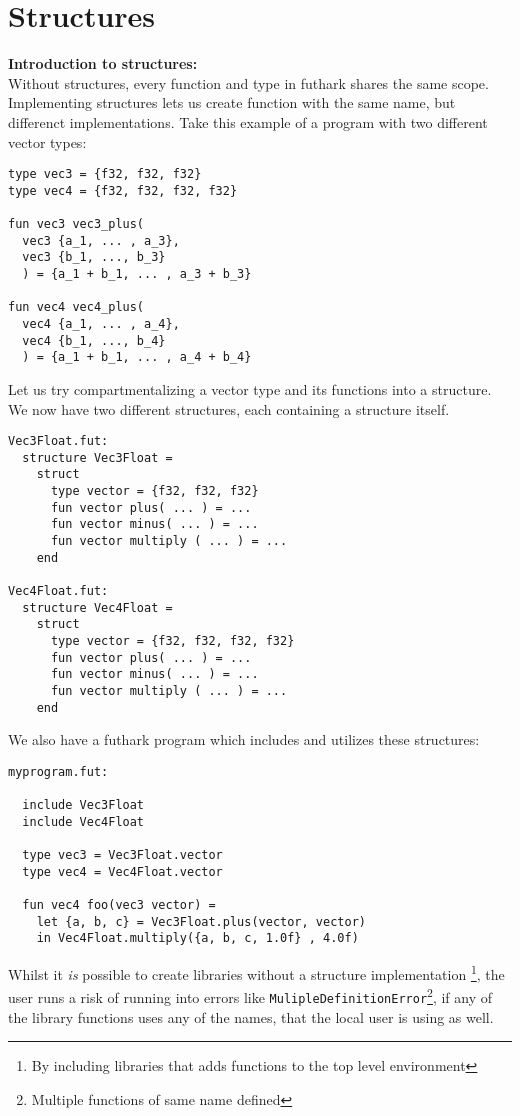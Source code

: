 \section{Structures}
\label{sec:structures}
\textbf{Introduction to structures:}\\
\label{subsec:structuresintroduction}
Without structures, every function and type in futhark shares the same scope.
Implementing structures lets us create function with the same name, but differenct implementations.
Take this example of a program with two different vector types:
\begin{verbatim}
type vec3 = {f32, f32, f32}
type vec4 = {f32, f32, f32, f32}

fun vec3 vec3_plus(
  vec3 {a_1, ... , a_3}, 
  vec3 {b_1, ..., b_3}
  ) = {a_1 + b_1, ... , a_3 + b_3}

fun vec4 vec4_plus(
  vec4 {a_1, ... , a_4}, 
  vec4 {b_1, ..., b_4}
  ) = {a_1 + b_1, ... , a_4 + b_4}
\end{verbatim}

Let us try compartmentalizing a vector type and its functions into a structure.
We now have two different structures, each containing a structure itself.
\begin{verbatim}
Vec3Float.fut:
  structure Vec3Float = 
    struct
      type vector = {f32, f32, f32}
      fun vector plus( ... ) = ...
      fun vector minus( ... ) = ...
      fun vector multiply ( ... ) = ...
    end

Vec4Float.fut:
  structure Vec4Float = 
    struct
      type vector = {f32, f32, f32, f32}
      fun vector plus( ... ) = ...
      fun vector minus( ... ) = ...
      fun vector multiply ( ... ) = ...
    end
\end{verbatim}
\clearpage
We also have a futhark program which includes and utilizes these structures:
\begin{verbatim}
myprogram.fut:

  include Vec3Float
  include Vec4Float

  type vec3 = Vec3Float.vector
  type vec4 = Vec4Float.vector
  
  fun vec4 foo(vec3 vector) = 
    let {a, b, c} = Vec3Float.plus(vector, vector)
    in Vec4Float.multiply({a, b, c, 1.0f} , 4.0f)
\end{verbatim}

Whilst it \textit{is} possible to create libraries without a structure
implementation \footnote{By including libraries that adds functions to the top
  level environment}, the user runs a risk of running into errors like
\texttt{MulipleDefinitionError}\footnote{Multiple functions of same name
  defined}, if any of the library functions uses any of the names, that the
local user is using as well.


